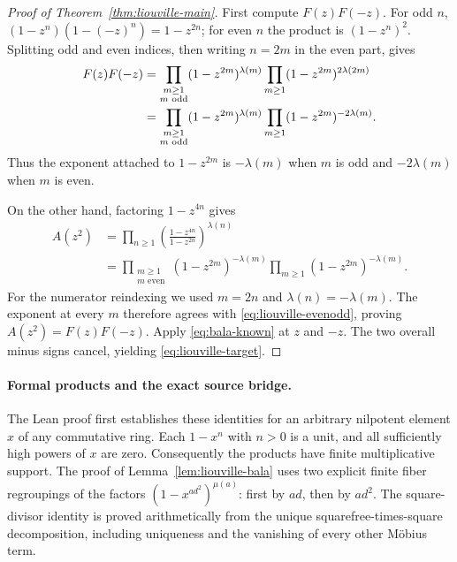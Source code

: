 \begin{proof}[Proof of Theorem~\ref{thm:liouville-main}]
First compute $F(z)F(-z)$. For odd $n$,
$(1-z^n)(1-(-z)^n)=1-z^{2n}$; for even $n$ the product is
$(1-z^n)^2$. Splitting odd and even indices, then writing $n=2m$ in
the even part, gives
\begin{align}
 F(z)F(-z)
 &=\prod_{\substack{m\ge1\\m\text{ odd}}}
       (1-z^{2m})^{\lambda(m)}
   \prod_{m\ge1}(1-z^{2m})^{2\lambda(2m)}\notag\\
 &=\prod_{\substack{m\ge1\\m\text{ odd}}}
       (1-z^{2m})^{\lambda(m)}
   \prod_{m\ge1}(1-z^{2m})^{-2\lambda(m)}.
   \label{eq:liouville-evenodd}
\end{align}
Thus the exponent attached to $1-z^{2m}$ is $-\lambda(m)$ when
$m$ is odd and $-2\lambda(m)$ when $m$ is even.

On the other hand, factoring $1-z^{4n}$ gives
\begin{align*}
 A(z^2)
 &=\prod_{n\ge1}
       \left(\frac{1-z^{4n}}{1-z^{2n}}\right)^{\lambda(n)}\\
 &=\prod_{\substack{m\ge1\\m\text{ even}}}
       (1-z^{2m})^{-\lambda(m)}
   \prod_{m\ge1}(1-z^{2m})^{-\lambda(m)}.
\end{align*}
For the numerator reindexing we used $m=2n$ and
$\lambda(n)=-\lambda(m)$. The exponent at every $m$ therefore
agrees with \eqref{eq:liouville-evenodd}, proving
$A(z^2)=F(z)F(-z)$. Apply \eqref{eq:bala-known} at $z$ and $-z$.
The two overall minus signs cancel, yielding
\eqref{eq:liouville-target}.
\end{proof}

\paragraph{Formal products and the exact source bridge.}
The Lean proof first establishes these identities for an arbitrary
nilpotent element $x$ of any commutative ring. Each $1-x^n$ with $n>0$
is a unit, and all sufficiently high powers of $x$ are zero. Consequently
the products have finite multiplicative support. The proof of
Lemma~\ref{lem:liouville-bala} uses two explicit finite fiber regroupings
of the factors $(1-x^{ad^2})^{\mu(a)}$: first by $ad$, then by $ad^2$.
The square-divisor identity is proved arithmetically from the unique
squarefree-times-square decomposition, including uniqueness and the
vanishing of every other M\"obius term.

